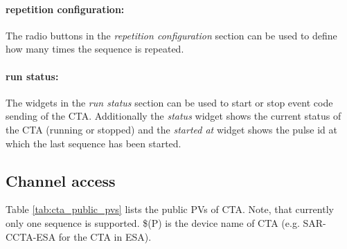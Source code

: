 \documentclass[12pt,a4paper]{article}
\begin{document}
\paragraph{repetition configuration:}
The radio buttons in the \emph{repetition configuration} section can be used
to define how many times the sequence is repeated.

\paragraph{run status:}
The widgets in the \emph{run status} section can be used to start or stop
event code sending of the CTA. Additionally the \emph{status} widget shows
the current status of the CTA (running or stopped) and the \emph{started at}
widget shows the pulse id at which the last sequence has been started.

\subsection{Channel access}

Table \ref{tab:cta_public_pvs} lists the public PVs of CTA. Note, that currently
only one sequence is supported. \$(P) is the device name of CTA (e.g. SAR-CCTA-ESA
for the CTA in ESA).
\end{document}
